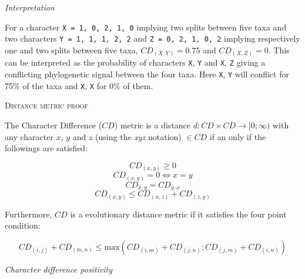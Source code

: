 \documentclass[12pt,letterpaper]{article}
\renewcommand{\section}[1]{%
\bigskip
\begin{center}
\begin{Large}
\normalfont\scshape #1
\medskip
\end{Large}
\end{center}}
\renewcommand{\subsection}[1]{%
\bigskip
\begin{center}
\begin{large}
\normalfont\itshape #1
\end{large}
\end{center}}
\begin{document}
\subsection{Interpretation}
For a character \texttt{X = {1, 0, 2, 1, 0}} implying two splits between five taxa and two characters \texttt{Y = {1, 1, 1, 2, 2}} and \texttt{Z = {0, 2, 1, 0, 2}} implying respectively one and two splits between five taxa, $CD_{(X,Y)} = 0.75$ and $CD_{(X,Z)} = 0$.
This can be interpreted as the probability of characters \texttt{X}, \texttt{Y} and \texttt{X}, \texttt{Z} giving a conflicting phylogenetic signal between the four taxa.
Here \texttt{X}, \texttt{Y} will conflict for 75\% of the taxa and \texttt{X}, \texttt{X} for 0\% of them.


\section{Distance metric proof}

The Character Difference ($CD$) metric is a distance $d: CD \times CD \rightarrow [0;\infty)$ with any character $x$, $y$ and $z$ (using the \textit{xyz} notation) $\in CD$ if an only if the followings are satisfied:

\begin{equation}
    \label{Positivity}
    CD_{(x,y)} \geq 0
\end{equation}
\begin{equation}
    \label{Identity}
    CD_{(x,y)} = 0 \Leftrightarrow x = y
\end{equation}
\begin{equation}
    \label{Equality}
    CD_{x,y} = CD_{y,x}
\end{equation}
\begin{equation}
    \label{Subadditivity}
    CD_{(x,y)} \leq CD_{(x,z)} + CD_{(z,y)}
\end{equation}

\noindent Furthermore, $CD$ is a evolutionary distance metric if it satisfies the four point condition:

\begin{equation}
    \label{fourpoint}
    CD_{(i,j)} + CD_{(m,n)} \leq \text{max}{(CD_{(i,m)} + CD_{(j,n)} ; CD_{(j,m)} + CD_{(i,n)} )}
\end{equation}

\newpage

\subsection{Character difference positivity}
\end{document}
